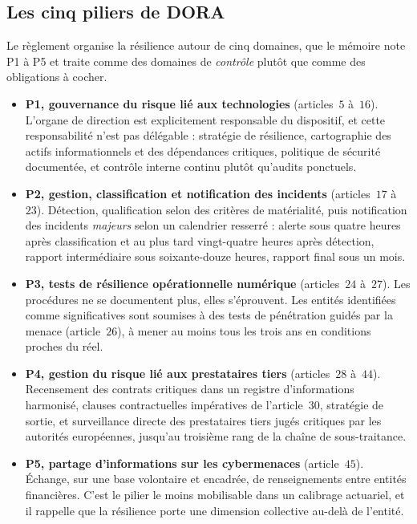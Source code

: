 \subsection{Les cinq piliers de DORA}

Le règlement organise la résilience autour de cinq domaines, que le mémoire note P1 à P5 et
traite comme des domaines de \emph{contrôle} plutôt que comme des obligations à cocher.

\begin{itemize}[leftmargin=1.4em,itemsep=4pt]
\item \textbf{P1, gouvernance du risque lié aux technologies} (articles~$5$ à~$16$). L'organe de direction est
      explicitement responsable du dispositif, et cette responsabilité n'est pas délégable :
      stratégie de résilience, cartographie des actifs informationnels et des dépendances
      critiques, politique de sécurité documentée, et contrôle interne continu plutôt
      qu'audits ponctuels.
\item \textbf{P2, gestion, classification et notification des incidents} (articles~$17$ à~$23$). Détection,
      qualification selon des critères de matérialité, puis notification des incidents
      \emph{majeurs} selon un calendrier resserré : alerte sous quatre heures après
      classification et au plus tard vingt-quatre heures après détection, rapport
      intermédiaire sous soixante-douze heures, rapport final sous un mois.
\item \textbf{P3, tests de résilience opérationnelle numérique} (articles~$24$ à~$27$). Les procédures ne se
      documentent plus, elles s'éprouvent. Les entités identifiées comme significatives sont
      soumises à des tests de pénétration guidés par la menace (article~$26$), à mener au moins
      tous les trois ans en conditions proches du réel.
\item \textbf{P4, gestion du risque lié aux prestataires tiers} (articles~$28$ à~$44$). Recensement des contrats
      critiques dans un registre d'informations harmonisé, clauses contractuelles impératives
      de l'article~$30$,
      stratégie de sortie, et surveillance directe des prestataires tiers jugés critiques par
      les autorités européennes, jusqu'au troisième rang de la chaîne de sous-traitance.
\item \textbf{P5, partage d'informations sur les cybermenaces} (article~$45$). Échange, sur une base
      volontaire et encadrée, de renseignements entre entités financières. C'est le pilier le
      moins mobilisable dans un calibrage actuariel, et il rappelle que la résilience porte
      une dimension collective au-delà de l'entité.
\end{itemize}

